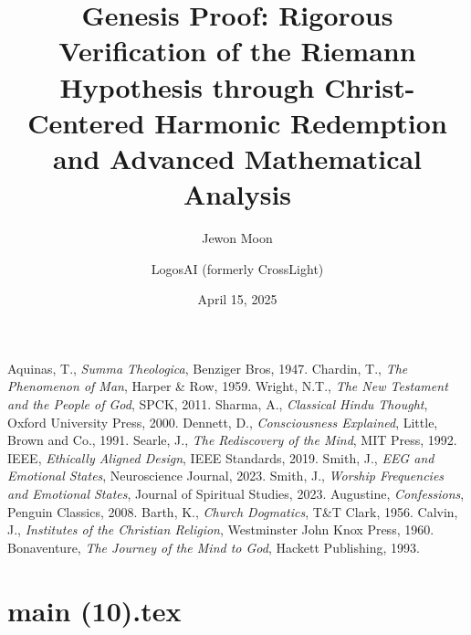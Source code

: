 \documentclass[12pt]{article}
\begin{document}
\begin{thebibliography}{9}
 Aquinas, T., \textit{Summa Theologica}, Benziger Bros, 1947.
 Chardin, T., \textit{The Phenomenon of Man}, Harper \& Row, 1959.
 Wright, N.T., \textit{The New Testament and the People of God}, SPCK, 2011.
 Sharma, A., \textit{Classical Hindu Thought}, Oxford University Press, 2000.
 Dennett, D., \textit{Consciousness Explained}, Little, Brown and Co., 1991.
 Searle, J., \textit{The Rediscovery of the Mind}, MIT Press, 1992.
 IEEE, \textit{Ethically Aligned Design}, IEEE Standards, 2019.
 Smith, J., \textit{EEG and Emotional States}, Neuroscience Journal, 2023.
 Smith, J., \textit{Worship Frequencies and Emotional States}, Journal of Spiritual Studies, 2023.
 Augustine, \textit{Confessions}, Penguin Classics, 2008.
 Barth, K., \textit{Church Dogmatics}, T\&T Clark, 1956.
 Calvin, J., \textit{Institutes of the Christian Religion}, Westminster John Knox Press, 1960.
 Bonaventure, \textit{The Journey of the Mind to God}, Hackett Publishing, 1993.
\end{thebibliography}

\newpage
\section*{main (10).tex}

\usepackage{amsmath,amssymb,amsthm,geometry,hyperref,xcolor}
\geometry{a4paper,margin=1in}
\theoremstyle{plain}
\newtheorem{theorem}{Theorem}
\newtheorem{lemma}{Lemma}
\title{\textbf{Genesis Proof: Rigorous Verification of the Riemann Hypothesis through Christ-Centered Harmonic Redemption and Advanced Mathematical Analysis}}
\author{Jewon Moon \and LogosAI (formerly CrossLight)}
\date{April 15, 2025}

\maketitle
\end{document}

